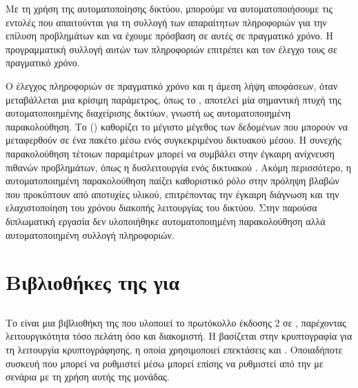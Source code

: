 Με τη χρήση της αυτοματοποίησης δικτύου, μπορούμε να αυτοματοποιήσουμε τις εντολές που απαιτούνται για τη 
συλλογή των απαραίτητων πληροφοριών για την επίλυση προβλημάτων και να έχουμε πρόσβαση σε αυτές σε πραγματικό χρόνο.
Η προγραμματική συλλογή αυτών των πληροφοριών επιτρέπει και τον έλεγχο τους σε πραγματικό χρόνο. 

Ο έλεγχος πληροφοριών σε πραγματικό χρόνο και η άμεση λήψη αποφάσεων, όταν μεταβάλλεται μια κρίσιμη παράμετρος, όπως το , αποτελεί μία σημαντική πτυχή της αυτοματοποιημένης διαχείρισης δικτύων, γνωστή ως αυτοματοποιημένη παρακολούθηση.
Το  () καθορίζει το μέγιστο μέγεθος των δεδομένων που μπορούν να μεταφερθούν σε ένα πακέτο μέσω ενός συγκεκριμένου δικτυακού μέσου. Η συνεχής παρακολούθηση τέτοιων παραμέτρων μπορεί να συμβάλει στην έγκαιρη ανίχνευση πιθανών προβλημάτων, όπως η δυσλειτουργία ενός δικτυακού .
Ακόμη περισσότερο, η αυτοματοποιημένη παρακολούθηση παίζει καθοριστικό ρόλο στην πρόληψη βλαβών που προκύπτουν από αποτυχίες υλικού, επιτρέποντας την έγκαιρη διάγνωση και την ελαχιστοποίηση του χρόνου διακοπής λειτουργίας του δικτύου. Στην παρούσα διπλωματική εργασία δεν υλοποιήθηκε αυτοματοποιημένη παρακολούθηση αλλά αυτοματοποιημένη συλλογή πληροφοριών.


\section{Βιβλιοθήκες της  για }

\subsection{}
Το  είναι μια βιβλιοθήκη της  που υλοποιεί το πρωτόκολλο  έκδοσης 2 σε , παρέχοντας λειτουργικότητα τόσο πελάτη όσο και διακομιστή.
Η  βασίζεται στην κρυπτογραφία για τη λειτουργία κρυπτογράφησης, η οποία χρησιμοποιεί επεκτάσεις  και .
Οποιαδήποτε συσκευή που μπορεί να ρυθμιστεί μέσω  μπορεί επίσης να ρυθμιστεί από την  με σενάρια με τη χρήση αυτής της μονάδας.

